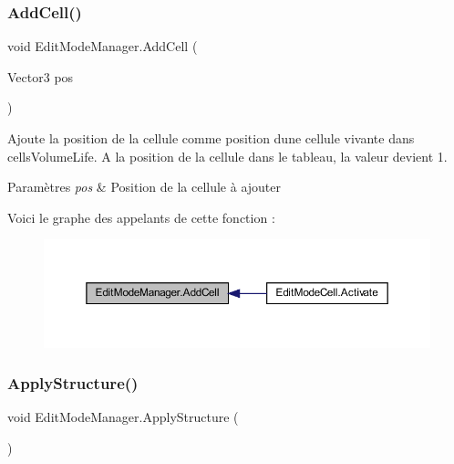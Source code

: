 \subsubsection{\texorpdfstring{Add\+Cell()}{AddCell()}}
{\footnotesize\ttfamily void Edit\+Mode\+Manager.\+Add\+Cell (\begin{DoxyParamCaption}\item[{Vector3}]{pos }\end{DoxyParamCaption})\hspace{0.3cm}{\ttfamily [inline]}}



Ajoute la position de la cellule comme position d\textquotesingle{}une cellule vivante dans cells\+Volume\+Life. A la position de la cellule dans le tableau, la valeur devient 1. 


\begin{DoxyParams}{Paramètres}
{\em pos} & Position de la cellule à ajouter\\
\hline
\end{DoxyParams}
Voici le graphe des appelants de cette fonction \+:\nopagebreak
\begin{figure}[H]
\begin{center}
\leavevmode
\includegraphics[width=350pt]{class_edit_mode_manager_a9f9fbe57f5bbb6b90dc1dc321d411c54_icgraph}
\end{center}
\end{figure}
\mbox{\label{class_edit_mode_manager_ac1d4e4f292d17b4364054f05ddc13bee}} 
\subsubsection{\texorpdfstring{Apply\+Structure()}{ApplyStructure()}}
{\footnotesize\ttfamily void Edit\+Mode\+Manager.\+Apply\+Structure (\begin{DoxyParamCaption}{ }\end{DoxyParamCaption})\hspace{0.3cm}{\ttfamily [inline]}}




